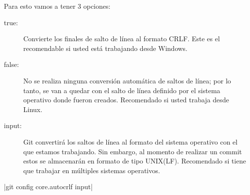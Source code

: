Para esto vamos a tener 3 opciones:

\begin{description}
	\item[true:]Convierte los finales de salto de línea al formato CRLF. Este es el recomendable si usted está trabajando desde Windows.
	\item[false:]No se realiza ninguna conversión automática de saltos de línea; por lo tanto, se van a quedar con el salto de línea definido por el sistema operativo donde fueron creados. Recomendado si usted trabaja desde Linux.
	\item[input:]Git convertirá los saltos de línea al formato del sistema operativo con el que estamos trabajando. Sin embargo, al momento de realizar un commit estos se almacenarán en formato de tipo UNIX(LF). Recomendado si tiene que trabajar en múltiples sistemas operativos.
\end{description}

\begin{terminal}
|git config core.autocrlf input|
\end{terminal}



